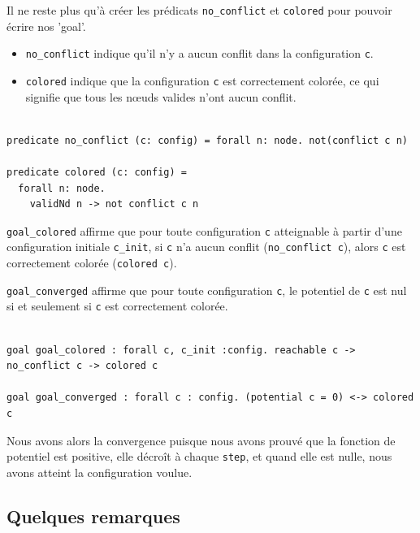\documentclass[11pt]{article}
\begin{document}
Il ne reste plus qu'à créer les prédicats \texttt{no\_conflict} et \texttt{colored} pour pouvoir écrire nos 'goal'.

\begin{itemize}
\item \texttt{no\_conflict} indique qu'il n'y a aucun conflit dans la configuration \texttt{c}.

\item \texttt{colored} indique que la configuration \texttt{c} est correctement colorée, ce qui signifie que tous les nœuds valides n'ont aucun conflit.
\end{itemize}


\lstset{language=why3,label= ,caption= ,captionpos=b,numbers=none}
\begin{lstlisting}

predicate no_conflict (c: config) = forall n: node. not(conflict c n)

predicate colored (c: config) =
  forall n: node.
    validNd n -> not conflict c n

\end{lstlisting}


\texttt{goal\_colored} affirme que pour toute configuration \texttt{c} atteignable à partir d'une configuration initiale \texttt{c\_init}, 
si \texttt{c} n'a aucun conflit (\texttt{no\_conflict c}), alors \texttt{c} est correctement colorée (\texttt{colored c}).

\texttt{goal\_converged} affirme que pour toute configuration \texttt{c}, le potentiel de \texttt{c} est nul si et seulement si \texttt{c} est correctement colorée.


\lstset{language=why3,label= ,caption= ,captionpos=b,numbers=none}
\begin{lstlisting}

goal goal_colored : forall c, c_init :config. reachable c -> no_conflict c -> colored c

goal goal_converged : forall c : config. (potential c = 0) <-> colored c

\end{lstlisting}


Nous avons alors la convergence puisque nous avons prouvé que la fonction de potentiel est positive, 
elle décroît à chaque \texttt{step}, et quand elle est nulle, nous avons atteint la configuration voulue.




\subsection{Quelques remarques}
\label{sec:org9361e43}
\end{document}
